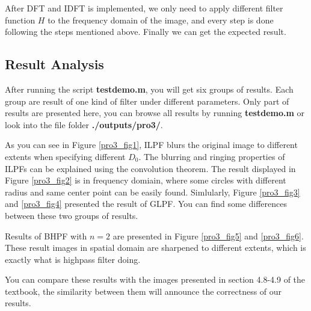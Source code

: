 \documentclass[11pt,a4paper]{article}
\begin{document}
After DFT and IDFT is implemented, we only need to apply different filter function
$H$ to the frequency domain of the image, and every step is done following the steps
mentioned above. Finally we can get the expected result.

\subsection{Result Analysis}
After running the script \textbf{testdemo.m}, you will get six groups of results.
Each group are result of one kind of filter under different parameters. Only part of 
results are presented here, you can browse all results by running \textbf{testdemo.m} or
look into the file folder \textbf{./outputs/pro3/}.

As you can see in Figure \ref{pro3_fig1}, ILPF blurs the original image to different extents
when specifying different $D_0$. The blurring and ringing properties of ILPFs can be explained using the
convolution theorem. The result displayed in Figure \ref{pro3_fig2} is in frequency domiain,
where some circles with different radius and same center point can be easily found. Simlularly, 
Figure \ref{pro3_fig3} and \ref{pro3_fig4} presented the result of GLPF. You can find some differences
between these two groups of results.

Results of BHPF with $n=2$ are presented in Figure \ref{pro3_fig5} and \ref{pro3_fig6}. These result images in 
spatial domain are sharpened to different extents, which is exactly what is highpass filter doing.

You can compare these results with the images presented in section 4.8-4.9 of the textbook, the similarity between
them will announce the correctness of our results.
\end{document}
